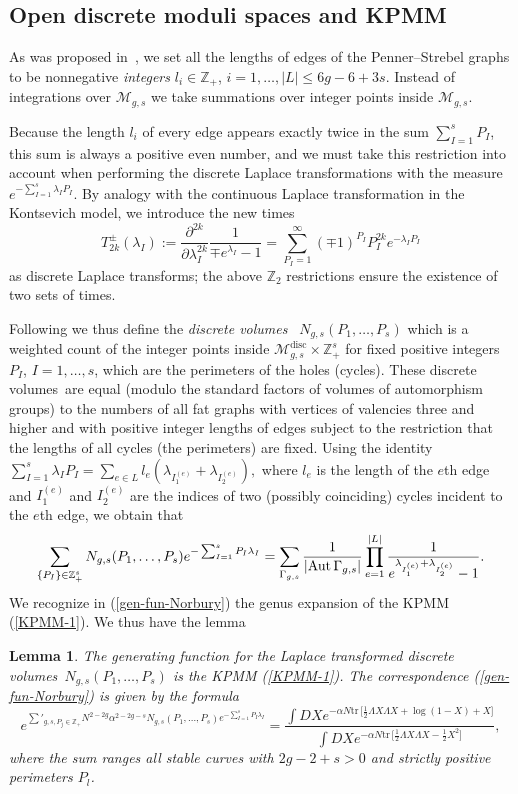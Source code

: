 \documentclass[11pt]{article}
\def\tr{{\mathrm{tr\,}}}
\def\pa{\partial}
\def\beq{\begin{equation}}
\def\eeq{\end{equation}}
\theoremstyle{plain}
\newtheorem{lemma}{Lemma}
\theoremstyle{definition}
\let\text=\mathrm
\def\disc{\text{disc}}
\def\beq{\begin{equation}}
\def\eeq{\end{equation}}
\newcommand {\dvol}{discrete volumes}%
\begin{document}
\subsection{Open discrete moduli spaces and KPMM}

As was proposed in~\cite{Ch93}, we set all the lengths of edges of the Penner--Strebel graphs to be nonnegative {\em integers}
$l_i\in {\mathbb Z}_+$, $i=1,\dots, |L|\le 6g-6+3s$. Instead of integrations over ${\mathcal M}_{g,s}$ we take
summations over integer points inside ${\mathcal M}_{g,s}$.

Because the length $l_i$ of every edge appears exactly twice in the sum $\sum_{I=1}^s P_I$,
this sum is always a positive even number, and we must take this restriction into account
when performing the discrete Laplace transformations with the measure $e^{-\sum_{I=1}^s \lambda_I P_I}$. By analogy with 
the continuous Laplace transformation in the Kontsevich model, we introduce 
the new times
\beq
T^\pm_{2k}(\lambda_I):=\frac{\pa^{2k}}{\pa \lambda^{2k}_I}\frac{1}{\mp e^{\lambda_I} -1}=\sum_{P_I=1}^\infty (\mp 1)^{P_I} P_I^{2k} 
e^{-\lambda_I P_I}
\label{times-KP}
\eeq
as discrete Laplace transforms; the above ${\mathbb Z}_2$ restrictions ensure the existence of two sets of times.

Following \cite{Norbury} we thus define the {\em \dvol\ } 
$N_{g,s}(P_1,\dots,P_s)$ which is a weighted count of the integer points inside
${\mathcal M}^{\disc}_{g,s}\times {\mathbb Z}_+^{s}$ for fixed positive integers $P_I$, $I=1,\dots,s$, which are
the perimeters of the holes (cycles). These \dvol\ are equal (modulo the standard factors of volumes of automorphism
groups) to the numbers of all fat graphs with vertices of valencies three and higher and with positive integer
lengths of edges subject to the restriction that the lengths of all cycles (the perimeters) are fixed. Using the identity
$\sum_{I=1}^s \lambda_I P_I=\sum_{e\in L} l_e(\lambda_{I^{(e)}_1}+\lambda_{I^{(e)}_2}),$
where $l_e$ is the length of the $e$th edge and $I^{(e)}_1$ and $I^{(e)}_2$ are the indices of two
(possibly coinciding) cycles incident to the $e$th edge, we obtain that
\beq
\sum_{\{P_I\}\in {\mathbb Z}_+^{s}}N_{g,s}(P_1,\dots,P_s)e^{-\sum_{I=1}^s P_I\lambda_I}
=\sum_{\Gamma_{g,s}}\frac{1}{|\hbox{Aut\,}\Gamma_{g,s}|}\prod_{e=1}^{|L|}
\frac{1}{e^{\lambda_{I^{(e)}_1}+\lambda_{I^{(e)}_2}}-1}.
\label{gen-fun-Norbury}
\eeq
We recognize in (\ref{gen-fun-Norbury}) the genus expansion of the KPMM (\ref{KPMM-1}).  We thus have the lemma
\begin{lemma}\label{lm:Norbury1}{\rm \cite{ACNP}}
The generating function for the Laplace transformed \dvol\  $N_{g,s}(P_1,\dots,P_s)$ is the
KPMM (\ref{KPMM-1}). The correspondence (\ref{gen-fun-Norbury})  is given by the formula
\beq
e^{\sum'_{g,s,P_j\in {\mathbb Z}_+}N^{2-2g}\alpha^{2-2g-s} N_{g,s}(P_1,\dots,P_s)e^{-\sum_{I=1}^s P_I\lambda_I}}
=\frac{\int DX e^{-\alpha N\tr\bigl[\frac12 \Lambda X\Lambda X+\log(1-X)+X \bigr]}}
{\int DX e^{-\alpha N\tr\bigl[\frac12 \Lambda X\Lambda X-\frac12 X^2\bigr]}},
\label{KPMM-Catalan}
\eeq
where the sum ranges all stable curves with $2g-2+s>0$ and strictly positive perimeters $P_l$.
\end{lemma}
\end{document}
